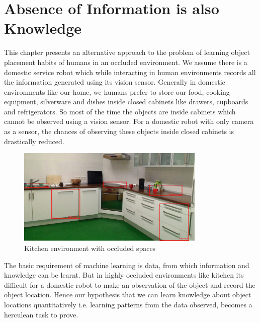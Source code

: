 

\chapter{Absence of Information is also Knowledge}

This chapter presents an alternative approach to the problem of learning object placement habits of humans in an occluded environment. We assume there is a domestic service robot which while interacting in human environments records all the information generated using its vision sensor.
Generally in domestic environments like our home, we humans prefer to store our food, cooking equipment, silverware and dishes inside closed cabinets like drawers, cupboards and refrigerators. So most of the time the objects are inside cabinets which cannot be observed using a vision sensor. For a domestic robot with only camera as a sensor, the chances of observing  these objects inside closed cabinets is drastically reduced.

\begin{figure}[htp]
\centering
\includegraphics[width=0.8\textwidth]{images/kitchen_crop_ano.png}
\caption{Kitchen environment with occluded spaces}
\label{fig:kitchen occluded}
\end{figure}
The basic requirement of machine learning is data, from which information and knowledge can be learnt. But in highly occluded environments like kitchen its difficult for a domestic robot to make an observation of the object and record the object location.  Hence our hypothesis that we can learn knowledge about object locations quantitatively i.e. learning patterns from the data observed, becomes a herculean task to prove.

